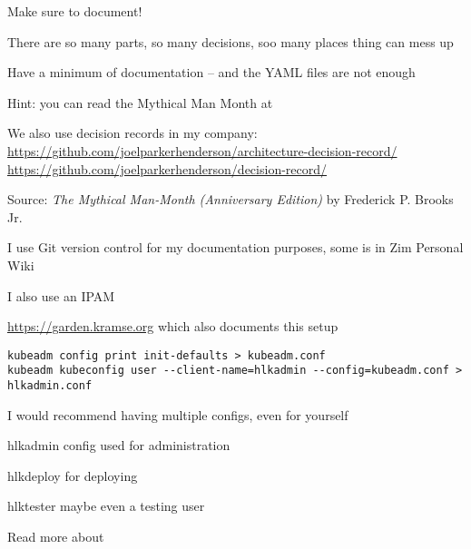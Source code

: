 \documentclass[Screen16to9,17pt]{foils}
\begin{document}

\begin{list2}
\item Make sure to document!
\item There are so many parts, so many decisions, soo many places thing can mess up
\item Have a minimum of documentation -- and the YAML files are not enough
\item Hint:  you can read the Mythical Man Month at 
\item We also use decision records in my company:\\
\url{https://github.com/joelparkerhenderson/architecture-decision-record/}\\
\url{https://github.com/joelparkerhenderson/decision-record/}

\end{list2}


Source: \emph{The Mythical Man-Month (Anniversary Edition)}
by Frederick P. Brooks Jr.

\begin{list2}
\item I use Git version control for my documentation purposes, some is in Zim Personal Wiki 
\item I also use an IPAM 
\item \url{https://garden.kramse.org} which also documents this setup
\end{list2}



\begin{verbatim}
kubeadm config print init-defaults > kubeadm.conf
kubeadm kubeconfig user --client-name=hlkadmin --config=kubeadm.conf > hlkadmin.conf
\end{verbatim}

\begin{list2}
\item I would recommend having multiple configs, even for yourself
\item hlkadmin config used for administration
\item hlkdeploy for deploying
\item hlktester maybe even a testing user
\item Read more about 
\end{list2}
\end{document}
